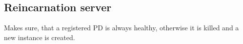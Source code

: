 
\subsection{Reincarnation server}
\label{sec:reincarnation_server}

Makes sure, that a registered PD is always healthy, otherwise
it is killed and a new instance is created.